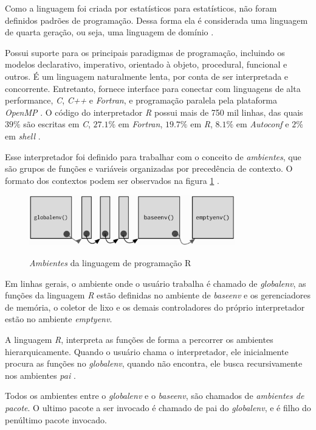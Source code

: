 Como a linguagem foi criada por estatísticos para estatísticos, não foram definidos padrões de programação. Dessa forma ela é considerada uma linguagem de quarta geração, ou seja, uma linguagem de domínio \cite{R-project}.

Possui suporte para os principais paradigmas de programação, incluindo os modelos  declarativo, imperativo, orientado à objeto, procedural, funcional e outros. É um linguagem naturalmente lenta, por conta de ser interpretada e concorrente. Entretanto, fornece interface para conectar com linguagens de alta performance, \textit{C}, \textit{C++} e \textit{Fortran}, e programação paralela pela plataforma \textit{OpenMP} . O código do interpretador \textit{R} possui mais de 750 mil linhas, das quais $39\%$ são escritas em \textit{C}, $27.1\%$ em \textit{Fortran}, $19.7\%$ em \textit{R}, $8.1\%$ em \textit{Autoconf} e $2\%$ em \textit{shell} \cite{OepnHub2017}. 

Esse interpretador foi definido para trabalhar com o conceito de \textit{ambientes}, que são grupos de funções e variáveis organizadas por precedência de contexto. O formato dos contextos podem ser observados na figura \ref{fig:R_Envs} .

\begin{figure}[!htb]
	\centering
	\caption{\textit{Ambientes} da linguagem de programação R}
	\includegraphics[width=0.8\textwidth]{./04-figuras/R-envs}
	\label{fig:R_Envs}
\end{figure}

Em linhas gerais, o ambiente onde o usuário trabalha é chamado de \textit{globalenv}, as funções da linguagem \textit{R} estão definidas no ambiente de \textit{baseenv} e os gerenciadores de memória, o coletor de lixo e os demais controladores do próprio interpretador estão no ambiente \textit{emptyenv}.

A linguagem \textit{R}, interpreta as funções de forma a percorrer os ambientes hierarquicamente. Quando o usuário chama o interpretador, ele inicialmente procura as funções no \textit{globalenv}, quando não encontra, ele busca recursivamente nos ambientes \textit{pai} \cite{TheRF2014}.

Todos os ambientes entre o \textit{globalenv} e o \textit{baseenv}, são chamados de \textit{ambientes de pacote}. 
O ultimo pacote a ser invocado é chamado de pai do \textit{globalenv}, e é filho do penúltimo pacote invocado. 

